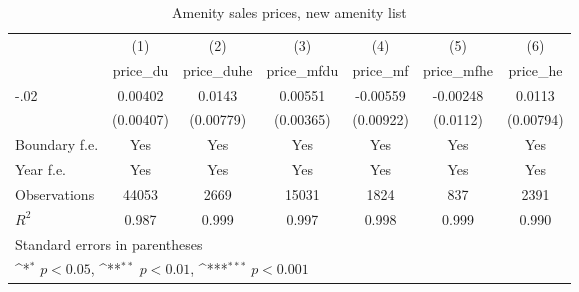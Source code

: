 \begin{table}[htbp]\centering
\def\sym#1{\ifmmode^{#1}\else\(^{#1}\)\fi}
\caption{Amenity sales prices, new amenity list}
\begin{tabular}{l*{6}{c}}
\hline\hline
                    &\multicolumn{1}{c}{(1)}&\multicolumn{1}{c}{(2)}&\multicolumn{1}{c}{(3)}&\multicolumn{1}{c}{(4)}&\multicolumn{1}{c}{(5)}&\multicolumn{1}{c}{(6)}\\
                    &\multicolumn{1}{c}{price\_du}&\multicolumn{1}{c}{price\_duhe}&\multicolumn{1}{c}{price\_mfdu}&\multicolumn{1}{c}{price\_mf}&\multicolumn{1}{c}{price\_mfhe}&\multicolumn{1}{c}{price\_he}\\
\hline
-.02                &     0.00402         &      0.0143         &     0.00551         &    -0.00559         &    -0.00248         &      0.0113         \\
                    &   (0.00407)         &   (0.00779)         &   (0.00365)         &   (0.00922)         &    (0.0112)         &   (0.00794)         \\
[1em]
Boundary f.e.       &         Yes         &         Yes         &         Yes         &         Yes         &         Yes         &         Yes         \\
[1em]
Year f.e.           &         Yes         &         Yes         &         Yes         &         Yes         &         Yes         &         Yes         \\
\hline
Observations        &       44053         &        2669         &       15031         &        1824         &         837         &        2391         \\
\(R^{2}\)           &       0.987         &       0.999         &       0.997         &       0.998         &       0.999         &       0.990         \\
\hline\hline
\multicolumn{7}{l}{\footnotesize Standard errors in parentheses}\\
\multicolumn{7}{l}{\footnotesize \sym{*} \(p<0.05\), \sym{**} \(p<0.01\), \sym{***} \(p<0.001\)}\\
\end{tabular}
\end{table}
